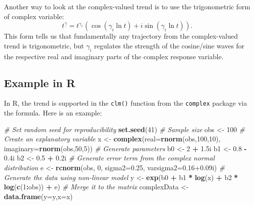 \documentclass[
]{book}
\newenvironment{Shaded}{\begin{snugshade}}{\end{snugshade}}
\newcommand{\CommentTok}[1]{\textcolor[rgb]{0.56,0.35,0.01}{\textit{#1}}}
\newcommand{\DataTypeTok}[1]{\textcolor[rgb]{0.13,0.29,0.53}{#1}}
\newcommand{\DecValTok}[1]{\textcolor[rgb]{0.00,0.00,0.81}{#1}}
\newcommand{\FloatTok}[1]{\textcolor[rgb]{0.00,0.00,0.81}{#1}}
\newcommand{\KeywordTok}[1]{\textcolor[rgb]{0.13,0.29,0.53}{\textbf{#1}}}
\newcommand{\NormalTok}[1]{#1}
\newcommand{\OperatorTok}[1]{\textcolor[rgb]{0.81,0.36,0.00}{\textbf{#1}}}
\newcommand{\StringTok}[1]{\textcolor[rgb]{0.31,0.60,0.02}{#1}}
\begin{document}
Another way to look at the complex-valued trend is to use the trigonometric form of complex variable:
\begin{equation}
    t^{\underline{\gamma}} = t^{\gamma_r} \left(\cos (\gamma_i \ln t) + i \sin (\gamma_i \ln t) \right) .
    \label{eq:trendTrig}
\end{equation}
This form tells us that fundamentally any trajectory from the complex-valued trend is trigonometric, but \(\gamma_i\) regulates the strength of the cosine/sine waves for the respective real and imaginary parts of the complex response variable.

\hypertarget{example-in-r}{%
\subsection{Example in R}\label{example-in-r}}

In R, the trend is supported in the \texttt{clm()} function from the \texttt{complex} package via the formula. Here is an example:

\begin{Shaded}
\begin{Highlighting}[]
\CommentTok{\# Set random seed for reproducibility}
\KeywordTok{set.seed}\NormalTok{(}\DecValTok{41}\NormalTok{)}
\CommentTok{\# Sample size}
\NormalTok{obs \textless{}{-}}\StringTok{ }\DecValTok{100}
\CommentTok{\# Create an explanatory variable}
\NormalTok{x \textless{}{-}}\StringTok{ }\KeywordTok{complex}\NormalTok{(}\DataTypeTok{real=}\KeywordTok{rnorm}\NormalTok{(obs,}\DecValTok{100}\NormalTok{,}\DecValTok{10}\NormalTok{), }\DataTypeTok{imaginary=}\KeywordTok{rnorm}\NormalTok{(obs,}\DecValTok{50}\NormalTok{,}\DecValTok{5}\NormalTok{))}
\CommentTok{\# Generate parameters}
\NormalTok{b0 \textless{}{-}}\StringTok{ }\DecValTok{2} \OperatorTok{+}\StringTok{ }\FloatTok{1.5}\NormalTok{i}
\NormalTok{b1 \textless{}{-}}\StringTok{ }\FloatTok{0.8} \OperatorTok{{-}}\StringTok{ }\FloatTok{0.4}\NormalTok{i}
\NormalTok{b2 \textless{}{-}}\StringTok{ }\FloatTok{0.5} \OperatorTok{+}\StringTok{ }\FloatTok{0.2}\NormalTok{i}
\CommentTok{\# Generate error term from the complex normal distribution}
\NormalTok{e \textless{}{-}}\StringTok{ }\KeywordTok{rcnorm}\NormalTok{(obs, }\DecValTok{0}\NormalTok{, }\DataTypeTok{sigma2=}\FloatTok{0.25}\NormalTok{, }\DataTypeTok{varsigma2=}\FloatTok{0.16+0.09}\NormalTok{i)}
\CommentTok{\# Generate the data using non{-}linear model}
\NormalTok{y \textless{}{-}}\StringTok{ }\KeywordTok{exp}\NormalTok{(b0 }\OperatorTok{+}\StringTok{ }\NormalTok{b1 }\OperatorTok{*}\StringTok{ }\KeywordTok{log}\NormalTok{(x) }\OperatorTok{+}\StringTok{ }\NormalTok{b2 }\OperatorTok{*}\StringTok{ }\KeywordTok{log}\NormalTok{(}\KeywordTok{c}\NormalTok{(}\DecValTok{1}\OperatorTok{:}\NormalTok{obs)) }\OperatorTok{+}\StringTok{ }\NormalTok{e)}
\CommentTok{\# Merge it to the matrix}
\NormalTok{complexData \textless{}{-}}\StringTok{ }\KeywordTok{data.frame}\NormalTok{(}\DataTypeTok{y=}\NormalTok{y,}\DataTypeTok{x=}\NormalTok{x)}
\end{Highlighting}
\end{Shaded}
\end{document}
